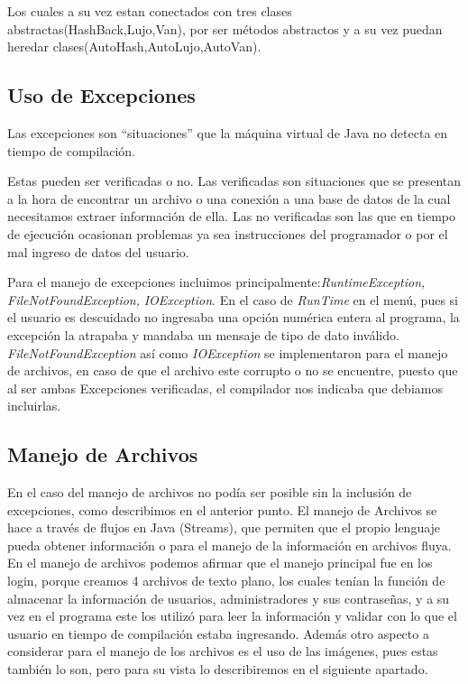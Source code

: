 \documentclass{article}
\begin{document}
Los cuales a su vez estan conectados con tres clases abstractas(HashBack,Lujo,Van), por ser métodos abstractos y a su vez puedan heredar clases(AutoHash,AutoLujo,AutoVan).

\subsection{Uso de Excepciones}

Las excepciones son ``situaciones'' que la máquina virtual de Java no detecta en tiempo de compilación.\newline

Estas pueden ser verificadas o no. Las verificadas son situaciones que se presentan a la hora de encontrar un archivo o una conexión a una base de datos de la cual necesitamos extraer información de ella. Las no verificadas son las que en tiempo de ejecución ocasionan problemas ya sea instrucciones del programador o por el mal ingreso de datos del usuario.\newline

Para el manejo de excepciones incluimos principalmente:\textit{RuntimeException, FileNotFoundException,} \textit{IOException}.\newline
\newline En el caso de \textit{RunTime} en el menú, pues si el usuario es descuidado no ingresaba una opción numérica entera al programa, la excepción la atrapaba y mandaba un mensaje de tipo de dato inválido.\newline
\newline \textit{FileNotFoundException} así como \textit{IOException} se implementaron para el manejo de archivos, en caso de que el archivo este corrupto o no se encuentre, puesto que  al ser ambas Excepciones verificadas, el compilador nos indicaba que debiamos incluirlas.

\subsection{Manejo de Archivos}

En el caso del manejo de archivos no podía ser posible sin la inclusión de excepciones, como describimos en el anterior punto.\newline
El manejo de Archivos se hace a través de flujos en Java (Streams), que permiten que el propio lenguaje pueda obtener información
 o para el manejo de la información en archivos fluya. \newline
En el manejo de archivos podemos afirmar que el manejo principal fue en los login, porque creamos 4 archivos de texto plano, los cuales tenían la función de
almacenar la información de usuarios, administradores y sus contraseñas, y a su vez en el programa este los utilizó para leer la información y validar con lo que el usuario
 en tiempo de compilación estaba ingresando.\newline
Además otro aspecto a considerar para el manejo de los archivos es el uso de las imágenes, pues estas también lo son, pero para su vista lo describiremos en el siguiente apartado.
\end{document}
